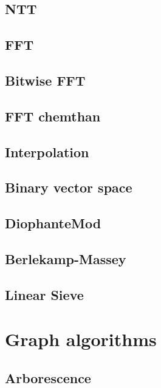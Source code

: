 \subsection{NTT}
\raggedbottom
\hrulefill
\subsection{FFT}
\raggedbottom
\hrulefill
\subsection{Bitwise FFT}
\raggedbottom
\hrulefill
\subsection{FFT chemthan}
\raggedbottom
\hrulefill
\subsection{Interpolation}
\raggedbottom
\hrulefill
\subsection{Binary vector space}
\raggedbottom
\hrulefill
\subsection{DiophanteMod}
\raggedbottom
\hrulefill
\subsection{Berlekamp-Massey}
\raggedbottom
\hrulefill
\subsection{Linear Sieve}
\raggedbottom
\hrulefill

\section{Graph algorithms}
\subsection{Arborescence}
\raggedbottom
\hrulefill
